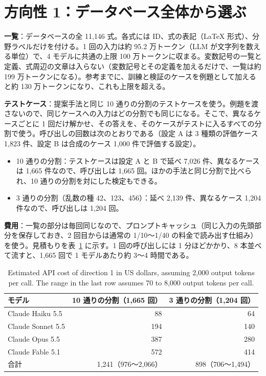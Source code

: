 \documentclass[11pt,a4paper]{ltjsarticle}
\begin{document}
\section{方向性 1：データベース全体から選ぶ}
\textbf{一覧}：データベースの全 11{,}146 式。各式には ID、式の表記（\LaTeX{} 形式）、分野ラベルだけを付ける。1 回の入力は約 95.2 万トークン（LLM が文字列を数える単位）で、4 モデルに共通の上限 100 万トークンに収まる。変数記号の一覧と定義、式周辺の文章は入らない（変数記号とその定義を加えるだけで、一覧は約 199 万トークンになる）。参考までに、訓練と検証のケースを例題として加えると約 130 万トークンになり、これも上限を超える。

\textbf{テストケース}：提案手法と同じ 10 通りの分割のテストケースを使う。例題を渡さないので、同じケースへの入力はどの分割でも同じになる。そこで、異なるケースごとに 1 回だけ解かせ、その答えを、そのケースがテストに入るすべての分割で使う。呼び出しの回数は次のとおりである（設定 A は 3 種類の評価ケース 1{,}823 件、設定 B は合成のケース 1{,}000 件で評価する設定）。
\begin{itemize}[leftmargin=1.5em]
  \item 10 通りの分割：テストケースは設定 A と B で延べ 7{,}026 件、異なるケースは 1{,}665 件なので、呼び出しは 1{,}665 回。ほかの手法と同じ分割で比べられ、10 通りの分割を対にした検定もできる。
  \item 3 通りの分割（乱数の種 42、123、456）：延べ 2{,}139 件、異なるケース 1{,}204 件なので、呼び出しは 1{,}204 回。
\end{itemize}

\textbf{費用}：一覧の部分は毎回同じなので、プロンプトキャッシュ（同じ入力の先頭部分を保存しておき、2 回目からは通常の 1/10〜1/40 の料金で読み出す仕組み）を使う。見積もりを表~\ref{tab:cost1} に示す。1 回の呼び出しには 1 分ほどかかり、8 本並べて流すと、1{,}665 回で 1 モデルあたり約 3〜4 時間である。

\begin{table}[h]\centering
\caption{Estimated API cost of direction 1 in US dollars, assuming 2,000 output tokens per call. The range in the last row assumes 70 to 8,000 output tokens per call.}
\label{tab:cost1}
\begin{tabular}{@{}lrr@{}}
\toprule
モデル & 10 通りの分割（1{,}665 回） & 3 通りの分割（1{,}204 回） \\
\midrule
Claude Haiku 5.5  & 88  & 64  \\
Claude Sonnet 5.5 & 194 & 140 \\
Claude Opus 5.5   & 387 & 280 \\
Claude Fable 5.1  & 572 & 414 \\
\midrule
合計 & 1{,}241（976〜2{,}066） & 898（706〜1{,}494） \\
\bottomrule
\end{tabular}
\end{table}
\end{document}
